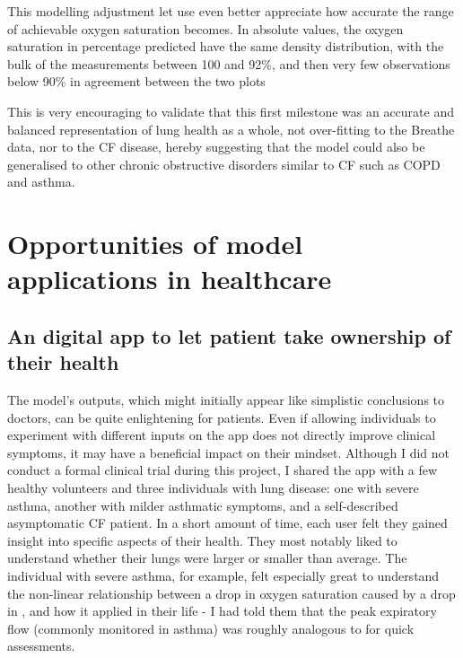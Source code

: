 This modelling adjustment let use even better appreciate how accurate the range of achievable oxygen saturation becomes. In absolute values, the oxygen saturation in percentage predicted have the same density distribution, with the bulk of the measurements between 100 and 92\%, and then very few observations below 90\% in agreement between the two plots



This is very encouraging to validate that this first milestone was an accurate and balanced representation of lung health as a whole, not over-fitting to the Breathe data, nor to the CF disease, hereby suggesting that the model could also be generalised to other chronic obstructive disorders similar to CF such as COPD and asthma.

\section{Opportunities of model applications in healthcare}

\subsection{An digital app to let patient take ownership of their health}
The model’s outputs, which might initially appear like simplistic conclusions to doctors, can be quite enlightening for patients. Even if allowing individuals to experiment with different inputs on the app does not directly improve clinical symptoms, it may have a beneficial impact on their mindset. Although I did not conduct a formal clinical trial during this project, I shared the app with a few healthy volunteers and three individuals with lung disease: one with severe asthma, another with milder asthmatic symptoms, and a self-described asymptomatic CF patient. In a short amount of time, each user felt they gained insight into specific aspects of their health. They most notably liked to understand whether their lungs were larger or smaller than average. The individual with severe asthma, for example, felt especially great to understand the non-linear relationship between a drop in oxygen saturation caused by a drop in \F, and how it applied in their life - I had told them that the peak expiratory flow (commonly monitored in asthma) was roughly analogous to \F for quick assessments.


